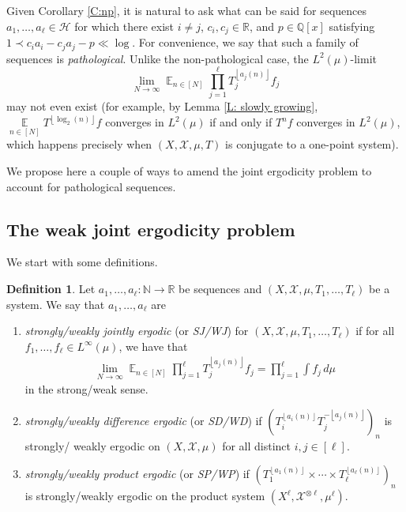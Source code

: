 \documentclass[11pt]{amsart}
\theoremstyle{definition}
\newtheorem{definition}[lemma]{Definition}
\DeclareMathOperator*{\E}{\mathbb{E}}
\newcommand{\N}{{\mathbb N}}
\newcommand{\Q}{{\mathbb Q}}
\newcommand{\R}{{\mathbb R}}
\newcommand{\CX}{{\mathcal X}}
\newcommand{\1}{{\mathbf{1}}}
\newcommand{\floor}[1]{{\left \lfloor #1 \right \rfloor}}
\begin{document}
Given Corollary \ref{C:np}, it is natural to ask what can be said for sequences $a_{1},\dots,a_{\ell}\in\mathcal{H}$ for which there exist $i\neq j$, $c_i, c_j\in\R$, and $p\in\Q[x]$ satisfying $1\prec c_i a_i - c_j a_j-p\ll \log$. For convenience, we say that such a family of sequences is \emph{pathological}. Unlike the non-pathological case, the $L^{2}(\mu)$-limit 
$$\lim_{N\to\infty}\E_{n\in[N]}\prod_{j=1}^\ell T_j^{\floor{a_{j}(n)}}f_j$$
may not even exist (for example, by Lemma \ref{L: slowly growing}, $\E\limits_{n\in[N]}T^{\floor{\log_{2}(n)}}f$ converges in $L^2(\mu)$ if and only if $T^{n}f$ converges in $L^2(\mu)$, which happens precisely when $(X, \CX, \mu, T)$ is conjugate to a one-point system).

We propose here a couple of ways to amend the joint ergodicity problem to account for pathological sequences.

\subsection{The weak joint ergodicity problem}
We start with some definitions. 





\begin{definition}
      Let $a_1, \ldots, a_\ell:\N\to\R$ be sequences and $(X, \CX, \mu, T_1, \ldots, T_\ell)$ be a system. We say that $a_1, \ldots, a_\ell$ are 
      \begin{enumerate}
      \item \textit{strongly/weakly jointly ergodic} (or \emph{SJ/WJ}) for $(X, \CX, \mu, T_1, \ldots, T_\ell)$  if for all $f_1, \ldots, f_\ell\in L^\infty(\mu)$, we have that
\begin{align}\label{E: joint ergodicity2}
        \lim_{N\to\infty}\E_{n\in[N]}\prod_{j=1}^\ell T_j^{\floor{a_{j}(n)}}f_j=\prod_{j=1}^\ell \int f_j\, d\mu
    \end{align}
    in the strong/weak sense.
    \item   \emph{strongly/weakly difference ergodic} (or \emph{SD/WD}) if $(T_i^{\floor{a_i(n)}}T_j^{-\floor{a_j(n)}})_n$ is strongly/ weakly ergodic on $(X, \CX, \mu)$ for all distinct $i, j\in[\ell]$.
     \item   \emph{strongly/weakly product ergodic} (or \emph{SP/WP}) if $(T_1^{\floor{a_1(n)}}\times \cdots \times T_\ell^{\floor{a_\ell(n)}})_n$ is strongly/weakly ergodic on the product system $(X^\ell, \CX^{\otimes \ell}, \mu^\ell)$.
      \end{enumerate}
\end{definition}
\end{document}
